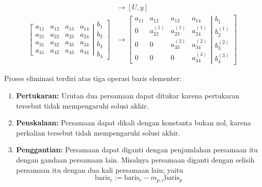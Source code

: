 \documentclass[pdflatex,compress,mathserif]{beamer}
\begin{document}
\begin{frame}
	\begin{align*}
	[A,b]
	&\rightarrow
	[U,y]
	\\
	\left[
	\begin{matrix}
	a_{11} & a_{12} & a_{13} & a_{14}\\
	a_{21} & a_{22} & a_{23} & a_{24}\\
	a_{31} & a_{32} & a_{33} & a_{34}\\
	a_{41} & a_{42} & a_{43} & a_{44}
	\end{matrix}
	\right|
	\left.
	\begin{matrix}
	b_{1}\\
	b_{2}\\
	b_{3}\\
	b_{4}
	\end{matrix}
	\right]
	&\rightarrow
	\left[
	\begin{matrix}
	a_{11} & a_{12} & a_{13} & a_{14}\\
	0 & a_{22}^{(1)} & a_{23}^{(1)} & a_{24}^{(1)}\\
	0 & 0 & a_{33}^{(2)} & a_{34}^{(2)}\\
	0 & 0 & 0 & a_{44}^{(3)}
	\end{matrix}
	\right|
	\left.
	\begin{matrix}
	b_{1}\\
	b_{2}^{(1)}\\
	b_{3}^{(2)}\\
	b_{4}^{(3)}
	\end{matrix}
	\right]
	\end{align*}
\end{frame}

\begin{frame}
	Proses eliminasi terdiri atas tiga operasi baris elementer:
	\begin{enumerate}
		\item \textbf{Pertukaran:} Urutan dua persamaan dapat ditukar karena pertukaran tersebut tidak mempengaruhi solusi akhir.
		\item \textbf{Penskalaan:} Persamaan dapat dikali dengan konstanta bukan nol, karena perkalian tersebut tidak mempengaruhi solusi akhir.
		\item \textbf{Penggantian:} Persamaan dapat diganti dengan penjumlahan persamaan itu dengan gandaan persamaan lain. Misalnya persamaan diganti dengan selisih persamaan itu dengan dua kali persamaan lain; yaitu
		\[ \text{baris}_r := \text{baris}_r - m_{p,r}\text{baris}_p \]
	\end{enumerate}
\end{frame}
\end{document}
